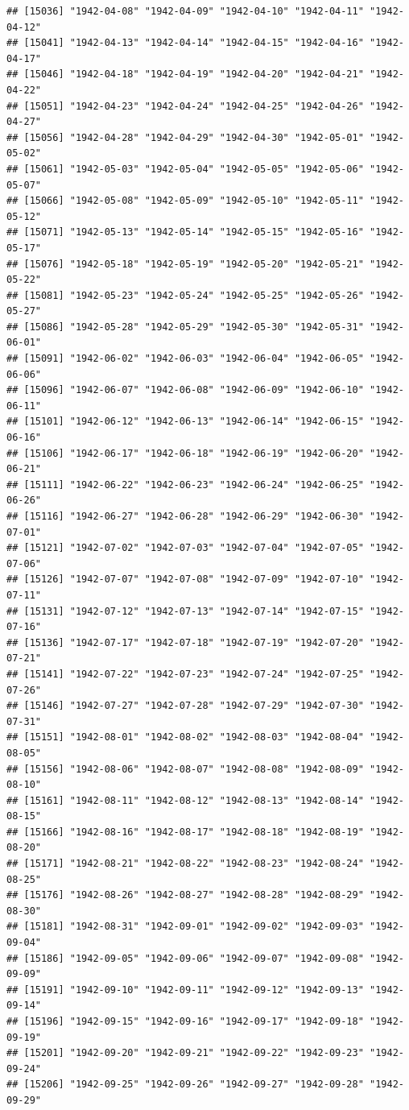 \documentclass{article}\usepackage[]{graphicx}\usepackage[]{color}
\makeatletter
\newenvironment{kframe}{%
 \def\at@end@of@kframe{}%
 \ifinner\ifhmode%
  \def\at@end@of@kframe{\end{minipage}}%
  \begin{minipage}{\columnwidth}%
 \fi\fi%
 \def\FrameCommand##1{\hskip\@totalleftmargin \hskip-\fboxsep
 \colorbox{shadecolor}{##1}\hskip-\fboxsep
     \hskip-\linewidth \hskip-\@totalleftmargin \hskip\columnwidth}%
 \MakeFramed {\advance\hsize-\width
   \@totalleftmargin\z@ \linewidth\hsize
   \@setminipage}}%
 {\par\unskip\endMakeFramed%
 \at@end@of@kframe}
\newenvironment{knitrout}{}{} %
\makeatother
\begin{document}
\begin{description}
\begin{knitrout}
\begin{kframe}
\begin{verbatim}
## [15036] "1942-04-08" "1942-04-09" "1942-04-10" "1942-04-11" "1942-04-12"
## [15041] "1942-04-13" "1942-04-14" "1942-04-15" "1942-04-16" "1942-04-17"
## [15046] "1942-04-18" "1942-04-19" "1942-04-20" "1942-04-21" "1942-04-22"
## [15051] "1942-04-23" "1942-04-24" "1942-04-25" "1942-04-26" "1942-04-27"
## [15056] "1942-04-28" "1942-04-29" "1942-04-30" "1942-05-01" "1942-05-02"
## [15061] "1942-05-03" "1942-05-04" "1942-05-05" "1942-05-06" "1942-05-07"
## [15066] "1942-05-08" "1942-05-09" "1942-05-10" "1942-05-11" "1942-05-12"
## [15071] "1942-05-13" "1942-05-14" "1942-05-15" "1942-05-16" "1942-05-17"
## [15076] "1942-05-18" "1942-05-19" "1942-05-20" "1942-05-21" "1942-05-22"
## [15081] "1942-05-23" "1942-05-24" "1942-05-25" "1942-05-26" "1942-05-27"
## [15086] "1942-05-28" "1942-05-29" "1942-05-30" "1942-05-31" "1942-06-01"
## [15091] "1942-06-02" "1942-06-03" "1942-06-04" "1942-06-05" "1942-06-06"
## [15096] "1942-06-07" "1942-06-08" "1942-06-09" "1942-06-10" "1942-06-11"
## [15101] "1942-06-12" "1942-06-13" "1942-06-14" "1942-06-15" "1942-06-16"
## [15106] "1942-06-17" "1942-06-18" "1942-06-19" "1942-06-20" "1942-06-21"
## [15111] "1942-06-22" "1942-06-23" "1942-06-24" "1942-06-25" "1942-06-26"
## [15116] "1942-06-27" "1942-06-28" "1942-06-29" "1942-06-30" "1942-07-01"
## [15121] "1942-07-02" "1942-07-03" "1942-07-04" "1942-07-05" "1942-07-06"
## [15126] "1942-07-07" "1942-07-08" "1942-07-09" "1942-07-10" "1942-07-11"
## [15131] "1942-07-12" "1942-07-13" "1942-07-14" "1942-07-15" "1942-07-16"
## [15136] "1942-07-17" "1942-07-18" "1942-07-19" "1942-07-20" "1942-07-21"
## [15141] "1942-07-22" "1942-07-23" "1942-07-24" "1942-07-25" "1942-07-26"
## [15146] "1942-07-27" "1942-07-28" "1942-07-29" "1942-07-30" "1942-07-31"
## [15151] "1942-08-01" "1942-08-02" "1942-08-03" "1942-08-04" "1942-08-05"
## [15156] "1942-08-06" "1942-08-07" "1942-08-08" "1942-08-09" "1942-08-10"
## [15161] "1942-08-11" "1942-08-12" "1942-08-13" "1942-08-14" "1942-08-15"
## [15166] "1942-08-16" "1942-08-17" "1942-08-18" "1942-08-19" "1942-08-20"
## [15171] "1942-08-21" "1942-08-22" "1942-08-23" "1942-08-24" "1942-08-25"
## [15176] "1942-08-26" "1942-08-27" "1942-08-28" "1942-08-29" "1942-08-30"
## [15181] "1942-08-31" "1942-09-01" "1942-09-02" "1942-09-03" "1942-09-04"
## [15186] "1942-09-05" "1942-09-06" "1942-09-07" "1942-09-08" "1942-09-09"
## [15191] "1942-09-10" "1942-09-11" "1942-09-12" "1942-09-13" "1942-09-14"
## [15196] "1942-09-15" "1942-09-16" "1942-09-17" "1942-09-18" "1942-09-19"
## [15201] "1942-09-20" "1942-09-21" "1942-09-22" "1942-09-23" "1942-09-24"
## [15206] "1942-09-25" "1942-09-26" "1942-09-27" "1942-09-28" "1942-09-29"

\end{verbatim}
\end{kframe}
\end{knitrout}
\end{description}
\end{document}
